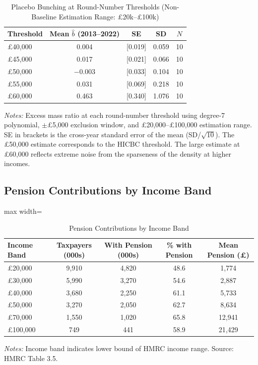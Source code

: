 \documentclass[12pt]{article}
\newcommand{\bhat}{\hat{b}}
\begin{document}
\begin{table}[H]
\centering
\caption{Placebo Bunching at Round-Number Thresholds (Non-Baseline Estimation Range: \pounds20k--\pounds100k)}
\label{tab:placebo_table}
\begin{threeparttable}
\begin{tabular}{lcccc}
\toprule
Threshold & Mean $\bhat$ (2013--2022) & SE & SD & $N$ \\
\midrule
\pounds40,000 & 0.004 & [0.019] & 0.059 & 10 \\
\pounds45,000 & 0.017 & [0.021] & 0.066 & 10 \\
\pounds50,000 & $-0.003$ & [0.033] & 0.104 & 10 \\
\pounds55,000 & 0.031 & [0.069] & 0.218 & 10 \\
\pounds60,000 & 0.463 & [0.340] & 1.076 & 10 \\
\bottomrule
\end{tabular}
\begin{tablenotes}[flushleft]
\small
\item \emph{Notes:} Excess mass ratio at each round-number threshold using degree-7 polynomial, $\pm$\pounds5,000 exclusion window, and \pounds20,000--\pounds100,000 estimation range. SE in brackets is the cross-year standard error of the mean (SD/$\sqrt{10}$). The \pounds50,000 estimate corresponds to the HICBC threshold. The large estimate at \pounds60,000 reflects extreme noise from the sparseness of the density at higher incomes.
\end{tablenotes}
\end{threeparttable}
\end{table}

\subsection{Pension Contributions by Income Band}

\begin{table}[H]
\centering
\caption{Pension Contributions by Income Band}
\label{tab:pension}
\begin{adjustbox}{max width=\textwidth}
\begin{tabular}{lcccc}
\toprule
Income Band & Taxpayers (000s) & With Pension (000s) & \% with Pension & Mean Pension (\pounds) \\
\midrule
\pounds20,000 & 9,910 & 4,820 & 48.6 & 1,774 \\
\pounds30,000 & 5,990 & 3,270 & 54.6 & 2,887 \\
\pounds40,000 & 3,680 & 2,250 & 61.1 & 5,733 \\
\pounds50,000 & 3,270 & 2,050 & 62.7 & 8,634 \\
\pounds70,000 & 1,550 & 1,020 & 65.8 & 12,941 \\
\pounds100,000 & 749 & 441 & 58.9 & 21,429 \\
\bottomrule
\end{tabular}
\end{adjustbox}
\par\vspace{0.3em}
{\footnotesize \emph{Notes:} Income band indicates lower bound of HMRC income range. Source: HMRC Table 3.5.}
\end{table}
\end{document}
